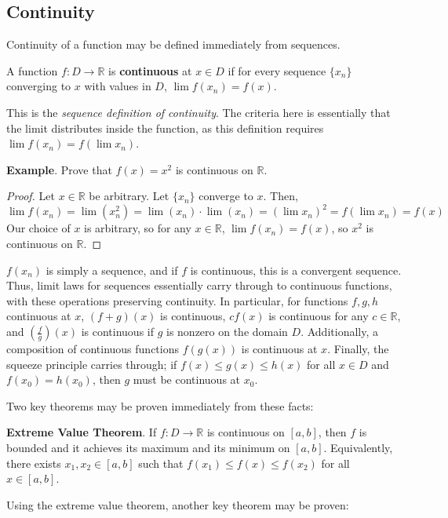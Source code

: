 \newpage

\subsection{Continuity}

Continuity of a function may be defined immediately from sequences.

\begin{defn}
    A function $f:D\to \mathbb{R}$ is \textbf{continuous} at $x\in D$ if for every sequence $\{x_n\}$ converging to $x$ with values in $D$, $\lim f(x_n) = f(x)$.
\end{defn}
This is the \textit{sequence definition of continuity}. The criteria here is essentially that the limit distributes inside the function, as this definition requires $\lim f(x_n) = f(\lim x_n)$.


\textbf{Example}. Prove that $f(x)=x^2$ is continuous on $\mathbb{R}$.

\begin{proof}
    Let $x\in\mathbb{R}$ be arbitrary. Let $\{x_n\}$ converge to $x$. Then, \[\lim f(x_n) = \lim (x_n^2) = \lim (x_n) \cdot \lim (x_n) = (\lim x_n)^2 = f(\lim x_n) = f(x)\] Our choice of $x$ is arbitrary, so for any $x\in\mathbb{R}$, $\lim f(x_n) = f(x)$, so $x^2$ is continuous on $\mathbb{R}$.
\end{proof}

$f(x_n)$ is simply a sequence, and if $f$ is continuous, this is a convergent sequence. Thus, limit laws for sequences essentially carry through to continuous functions, with these operations preserving continuity. In particular, for functions $f,g,h$ continuous at $x$, $(f+g)(x)$ is continuous, $cf(x)$ is continuous for any $c\in\mathbb{R}$, and $\left(\frac{f}{g}\right)(x)$ is continuous if $g$ is nonzero on the domain $D$. Additionally, a composition of continuous functions $f(g(x))$ is continuous at $x$. Finally, the squeeze principle carries through; if $f(x)\leq g(x)\leq h(x)$ for all $x\in D$ and $f(x_0)=h(x_0)$, then $g$ must be continuous at $x_0$.

Two key theorems may be proven immediately from these facts:

\textbf{Extreme Value Theorem}. If $f:D\to\mathbb{R}$ is continuous on $[a,b]$, then $f$ is bounded and it achieves its maximum and its minimum on $[a,b]$. Equivalently, there exists $x_1,x_2\in [a,b]$ such that $f(x_1)\leq f(x) \leq f(x_2)$ for all $x\in[a,b]$.

Using the extreme value theorem, another key theorem may be proven:

